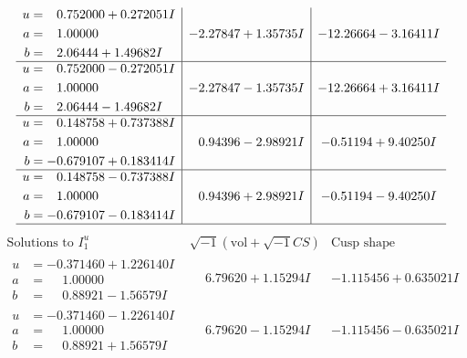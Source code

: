 \documentclass[1p]{elsarticle_modified}
\theoremstyle{definition}
\newcommand{\I}{\sqrt{-1}}
\begin{document}
$$\begin{array}{c|c|c}
\begin{aligned}
u &= \phantom{-}0.752000 + 0.272051 I \\
a &= \phantom{-}1.00000\phantom{ +0.000000I} \\
b &= \phantom{-}2.06444 + 1.49682 I\end{aligned}
 & -2.27847 + 1.35735 I & -12.26664 - 3.16411 I \\ \hline\begin{aligned}
u &= \phantom{-}0.752000 - 0.272051 I \\
a &= \phantom{-}1.00000\phantom{ +0.000000I} \\
b &= \phantom{-}2.06444 - 1.49682 I\end{aligned}
 & -2.27847 - 1.35735 I & -12.26664 + 3.16411 I \\ \hline\begin{aligned}
u &= \phantom{-}0.148758 + 0.737388 I \\
a &= \phantom{-}1.00000\phantom{ +0.000000I} \\
b &= -0.679107 + 0.183414 I\end{aligned}
 & \phantom{-}0.94396 - 2.98921 I & -0.51194 + 9.40250 I \\ \hline\begin{aligned}
u &= \phantom{-}0.148758 - 0.737388 I \\
a &= \phantom{-}1.00000\phantom{ +0.000000I} \\
b &= -0.679107 - 0.183414 I\end{aligned}
 & \phantom{-}0.94396 + 2.98921 I & -0.51194 - 9.40250 I\\
 \hline 
 \end{array}$$\newpage$$\begin{array}{c|c|c}  
\text{Solutions to }I^u_{1}& \I (\text{vol} + \sqrt{-1}CS) & \text{Cusp shape}\\
 \hline 
\begin{aligned}
u &= -0.371460 + 1.226140 I \\
a &= \phantom{-}1.00000\phantom{ +0.000000I} \\
b &= \phantom{-}0.88921 - 1.56579 I\end{aligned}
 & \phantom{-}6.79620 + 1.15294 I & -1.115456 + 0.635021 I \\ \hline\begin{aligned}
u &= -0.371460 - 1.226140 I \\
a &= \phantom{-}1.00000\phantom{ +0.000000I} \\
b &= \phantom{-}0.88921 + 1.56579 I\end{aligned}
 & \phantom{-}6.79620 - 1.15294 I & -1.115456 - 0.635021 I \\ \hline\begin{aligned}

\end{aligned}
\end{array}$$
\end{document}
